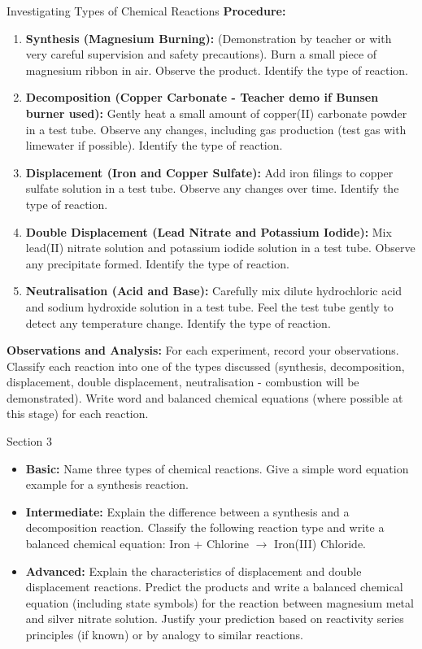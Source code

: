 {\begin{investigation}{Investigating Types of Chemical Reactions}
\textbf{Procedure:}
\begin{enumerate}
    \item \textbf{Synthesis (Magnesium Burning):}  (Demonstration by teacher or with very careful supervision and safety precautions). Burn a small piece of magnesium ribbon in air. Observe the product. Identify the type of reaction.
    \item \textbf{Decomposition (Copper Carbonate - Teacher demo if Bunsen burner used):} Gently heat a small amount of copper(II) carbonate powder in a test tube. Observe any changes, including gas production (test gas with limewater if possible). Identify the type of reaction.
    \item \textbf{Displacement (Iron and Copper Sulfate):} Add iron filings to copper sulfate solution in a test tube. Observe any changes over time. Identify the type of reaction.
    \item \textbf{Double Displacement (Lead Nitrate and Potassium Iodide):} Mix lead(II) nitrate solution and potassium iodide solution in a test tube. Observe any precipitate formed. Identify the type of reaction.
    \item \textbf{Neutralisation (Acid and Base):} Carefully mix dilute hydrochloric acid and sodium hydroxide solution in a test tube.  Feel the test tube gently to detect any temperature change.  Identify the type of reaction.
\end{enumerate}

\textbf{Observations and Analysis:}
For each experiment, record your observations. Classify each reaction into one of the types discussed (synthesis, decomposition, displacement, double displacement, neutralisation - combustion will be demonstrated). Write word and balanced chemical equations (where possible at this stage) for each reaction.
\end{investigation}

\begin{tieredquestions}{Section 3}
\begin{itemize}
    \item \textbf{Basic:}  Name three types of chemical reactions. Give a simple word equation example for a synthesis reaction.
    \item \textbf{Intermediate:} Explain the difference between a synthesis and a decomposition reaction. Classify the following reaction type and write a balanced chemical equation:  Iron + Chlorine $\rightarrow$ Iron(III) Chloride.
    \item \textbf{Advanced:}  Explain the characteristics of displacement and double displacement reactions. Predict the products and write a balanced chemical equation (including state symbols) for the reaction between magnesium metal and silver nitrate solution. Justify your prediction based on reactivity series principles (if known) or by analogy to similar reactions.
\end{itemize}
\end{tieredquestions}

}
